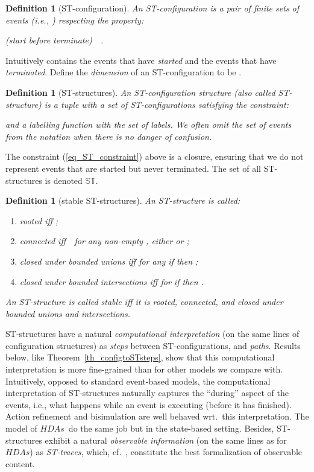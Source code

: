 \documentclass[submission,copyright,creativecommons]{eptcs}
\newtheorem{definition}[theorem]{Definition}
\newcommand{\refeq}[1]{(\ref{#1})}
\newcommand\HDAs{\ensuremath{\mathit{HDAs}}}
\newcommand\allST{\ensuremath{\mathbb{ST}}}
\begin{document}
\begin{definition}[ST-configuration]\label{def_STconfig}
An \emph{ST-configuration} is a pair of finite sets  
 of events (i.e., ) 
respecting the property:
\begin{center}
(start before terminate)\ \ .
\end{center}
\end{definition}

Intuitively  contains the events that have \textit{started} and  the events that have \textit{terminated}.
Define the \emph{dimension} of an ST-configuration to be .

\begin{definition}[ST-structures]\label{def_st_structs}
An \emph{ST-configuration structure} (also called \emph{ST-structure}) is a tuple  with  a set of ST-configurations satisfying the \emph{constraint}:

and   a labelling function with  the set of labels.
We often omit the set of events  from the notation when there is no danger of confusion.
\end{definition}

The constraint \refeq{eq_ST_constraint} above is a closure, ensuring that we do not represent events that are started but never terminated. The set of all ST-structures is denoted \allST.


\begin{definition}[stable ST-structures]\label{def_stableST}
An ST-structure  is called:
\begin{enumerate}
 \item\label{def_stableST_rooted} \emph{rooted} iff ;
\item\label{def_stableST_connected} \emph{connected} iff\ \, for any non-empty , either  or ;
\item \emph{closed under bounded unions} iff for any  if  then ;
\item \emph{closed under bounded intersections} iff for  if  then .
\end{enumerate}
An ST-structure is called \emph{stable} iff it is rooted, connected, and closed under bounded unions and intersections.
\end{definition}

ST-structures have a natural \textit{computational interpretation} (on the same lines of configuration structures) as \textit{steps} between ST-configurations, and \textit{paths}. Results below, like Theorem~\ref{th_configtoSTsteps}, show that this computational interpretation is more fine-grained than for  other models we compare with. 
Intuitively, opposed to standard event-based models, the computational interpretation of ST-structures naturally captures the ``during'' aspect of the events, i.e., what happens while an event is executing (before it has finished). Action refinement and bisimulation are well behaved wrt.\ this interpretation. The model of \HDAs\ do the same job but in the state-based setting.
Besides, ST-structures exhibit a natural \textit{observable information} (on the same lines as for \HDAs) as \textit{ST-traces}, which, cf.~\cite[Sec.7.3]{Glabbeek06HDA}, constitute the best formalization of observable content.
\end{document}
